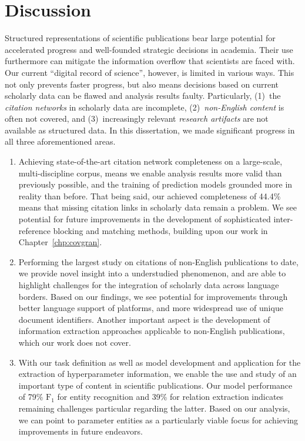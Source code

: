 \section{Discussion}

Structured representations of scientific publications bear large potential for accelerated progress and well-founded strategic decisions in academia. Their use furthermore can mitigate the information overflow that scientists are faced with.
Our current ``digital record of science'', however, is limited in various ways. This not only prevents faster progress, but also means decisions based on current scholarly data can be flawed and analysis results faulty.
Particularly, (1)~the \emph{citation networks} in scholarly data are incomplete, (2)~\emph{non-English content} is often not covered, and (3)~increasingly relevant \emph{research artifacts} are not available as structured data.
In this dissertation, we made significant progress in all three aforementioned areas.

\begin{enumerate}
\item Achieving state-of-the-art citation network completeness on a large-scale, multi-discipline corpus,
means we enable analysis results more valid than previously possible, and the training of prediction models grounded more in reality than before.
That being said, our achieved completeness of 44.4\% means that missing citation links in scholarly data remain a problem.
We see potential for future improvements in the development of sophisticated inter-reference blocking and matching methods, building upon our work in Chapter~\ref{chp:covgran}.
%
\item Performing the largest study on citations of non-English publications to date,
we provide novel insight into a understudied phenomenon, and are able to highlight challenges for the integration of scholarly data across language borders.
Based on our findings, we see potential for improvements through better language support of platforms, and more widespread use of unique document identifiers. Another important aspect is the development of information extraction approaches applicable to non-English publications, which our work does not cover.
%
\item With our task definition as well as model development and application for the extraction of hyperparameter information,
we enable the use and study of an important type of content in scientific publications.
Our model performance of 79\% $\text{F}_1$ for entity recognition and 39\% for relation extraction indicates remaining challenges particular regarding the latter.
Based on our analysis, we can point to parameter entities as a particularly viable focus for achieving improvements in future endeavors.
\end{enumerate}

